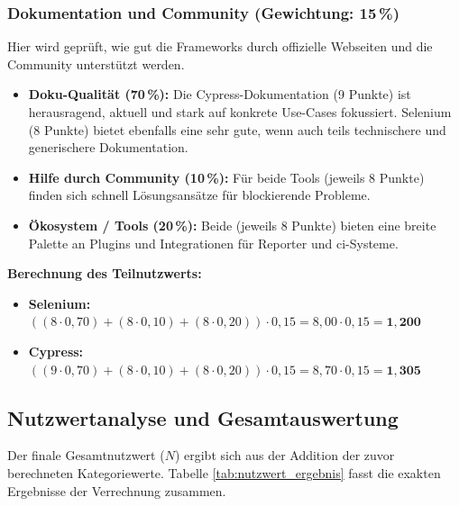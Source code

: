 \subsubsection{Dokumentation und Community (Gewichtung: 15\,\%)}
\label{sec:eval_doku}
Hier wird geprüft, wie gut die Frameworks durch offizielle Webseiten und die Community unterstützt werden.
\begin{itemize}
    \item \textbf{Doku-Qualität (70\,\%):} Die Cypress-Dokumentation (9 Punkte) ist herausragend, aktuell und stark auf konkrete Use-Cases fokussiert. Selenium (8 Punkte) bietet ebenfalls eine sehr gute, wenn auch teils technischere und generischere Dokumentation.
    \item \textbf{Hilfe durch Community (10\,\%):} Für beide Tools (jeweils 8 Punkte) finden sich schnell Lösungsansätze für blockierende Probleme.
    \item \textbf{Ökosystem / Tools (20\,\%):} Beide (jeweils 8 Punkte) bieten eine breite Palette an Plugins und Integrationen für Reporter und \gls{ci}-Systeme.
\end{itemize}

\textbf{Berechnung des Teilnutzwerts:}
\begin{itemize}
    \item[] \textbf{Selenium:} $((8 \cdot 0{,}70) + (8 \cdot 0{,}10) + (8 \cdot 0{,}20)) \cdot 0{,}15 = 8{,}00 \cdot 0{,}15 = \mathbf{1{,}200}$
    \item[] \textbf{Cypress:} $((9 \cdot 0{,}70) + (8 \cdot 0{,}10) + (8 \cdot 0{,}20)) \cdot 0{,}15 = 8{,}70 \cdot 0{,}15 = \mathbf{1{,}305}$
\end{itemize}


\subsection{Nutzwertanalyse und Gesamtauswertung}
\label{sec:nutzwertanalyse}

Der finale Gesamtnutzwert ($N$) ergibt sich aus der Addition der zuvor berechneten Kategoriewerte. Tabelle \ref{tab:nutzwert_ergebnis} fasst die exakten Ergebnisse der Verrechnung zusammen.

